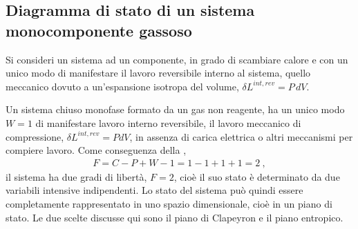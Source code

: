 \documentclass[letterpaper,10pt,italian]{jupyterBook}
\begin{document}
\subsection{Diagramma di stato di un sistema mono\sphinxhyphen{}componente gassoso}
\label{\detokenize{ch/thermodynamics/principles-phase-diagrams:diagramma-di-stato-di-un-sistema-mono-componente-gassoso}}
\sphinxAtStartPar
Si consideri un sistema ad un componente, in grado di scambiare calore e con un unico modo di manifestare il lavoro reversibile interno al sistema, quello meccanico dovuto a un’espansione isotropa del volume, \(\delta L^{int,rev} = P \, d V\).

\sphinxAtStartPar
Un sistema chiuso monofase formato da un gas non reagente, ha un unico modo \(W=1\) di manifestare lavoro interno reversibile, il lavoro meccanico di compressione, \(\delta L^{int,rev} = P dV\), in assenza di carica elettrica o altri meccanismi per compiere lavoro. Come conseguenza della {\hyperref[\detokenize{ch/thermodynamics/principles-gibbs-phase-rule:physics-hs-thermodynamics-foundation-principles-gibbs-phase-rule-gibbs-phase-rule}]{}},
\begin{equation*}
\begin{split}F = C - P + W - 1 = 1 - 1 + 1 + 1 = 2 \ ,\end{split}
\end{equation*}
\sphinxAtStartPar
il sistema ha due gradi di libertà, \(F=2\), cioè il suo stato è determinato da due variabili intensive indipendenti. Lo stato del sistema può quindi essere completamente rappresentato in uno spazio dimensionale, cioè in un piano di stato.
Le due scelte discusse qui sono il piano di Clapeyron e il piano entropico.
\end{document}
